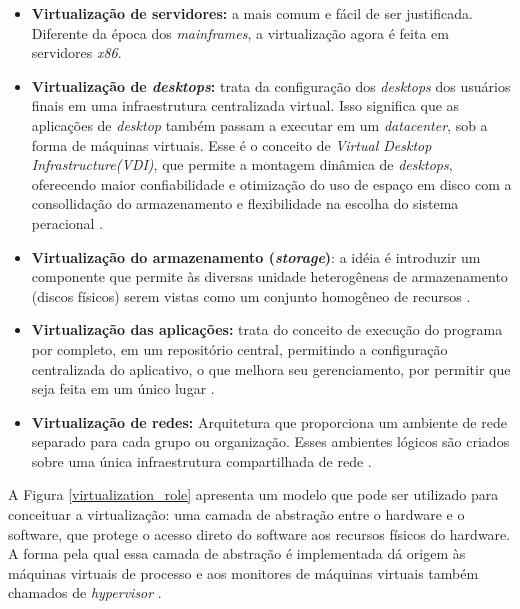 \begin{itemize}
\item \textbf{Virtualização de servidores:} a mais comum e fácil de ser justificada. Diferente da época dos \textit{mainframes}, a virtualização agora é feita em servidores \textit{x86}.

\item \textbf{Virtualização de \textit{desktops}:} trata da configuração dos \textit{desktops} dos usuários finais em uma infraestrutura centralizada virtual. Isso significa que as aplicações de \textit{desktop} também passam a executar em um \textit{datacenter}, sob a forma de máquinas virtuais. Esse é o conceito de \textit{Virtual Desktop Infrastructure(VDI)}, que permite a montagem dinâmica de \textit{desktops}, oferecendo maior confiabilidade e otimização do uso de espaço em disco com a consollidação do armazenamento e flexibilidade na escolha do sistema peracional \cite{manoel}.

\item \textbf{Virtualização do armazenamento (\textit{storage})}: a idéia é introduzir um componente que permite às diversas unidade heterogêneas de armazenamento (discos físicos) serem vistas como um conjunto homogêneo de recursos \cite{manoel}.

\item \textbf{Virtualização das aplicações:} trata do conceito de execução do programa por completo, em um repositório central, permitindo a configuração centralizada do aplicativo, o que melhora seu gerenciamento, por permitir que seja feita em um único lugar \cite{manoel}. 

\item \textbf{Virtualização de redes: } Arquitetura que proporciona um ambiente de rede separado para cada grupo ou organização. Esses ambientes lógicos são criados sobre uma única infraestrutura compartilhada de rede \cite{manoel}.

\end{itemize}

A Figura \ref{virtualization_role} apresenta um modelo que pode ser utilizado para conceituar a virtualização: uma camada de abstração entre o hardware e o software, que protege o acesso direto do software aos recursos físicos do hardware. A forma pela qual essa camada de abstração é implementada dá origem às máquinas virtuais de processo e aos monitores de máquinas virtuais também chamados de \textit{hypervisor} \cite{manoel}.

